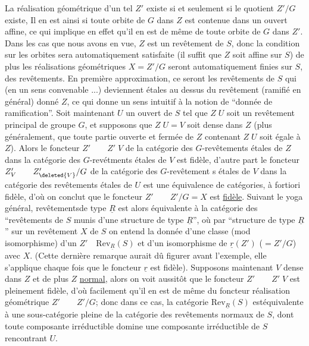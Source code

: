 La réalisation géométrique d'un tel $Z'$ existe si et seulement si le quotient $Z'/G$ existe,  Il en est ainsi si toute orbite de $G$ dans $Z$ est contenue dans un ouvert affine, ce qui implique en effet qu'il en est de même de toute orbite de $G$ dans $Z'$.  Dans les cas que nous avons en vue, $Z$ est un revêtement de $S$, donc la condition sur les orbites sera automatiquement satisfaite (il suffit que $Z$ soit affine sur $S$) de plus les réalisations géométriques $X=Z'/G$ seront automatiquement finies sur $S$,  des revêtements. En première approximation, ce seront les revêtements de $S$ qui (en  un sens convenable ...) deviennent étales au dessus du revêtement (ramifié en général) donné $Z$, ce qui donne un sens intuitif à la notion de ``donnée de ramification''. Soit maintenant $U$ un ouvert de $S$ tel que $Z\;U$ soit un revêtement principal de groupe $G$, et supposons que $Z\;U=V$ soit dense dans $Z$ (plus généralement, que toute partie ouverte et fermée de $Z$ contenant $Z\;U$  soit égale à $Z$). Alors le foncteur $Z'\qquad Z'\;V$ de la catégorie des $G$-revêtements étales de $Z$ dans la catégorie des $G$-revétments étales de $V$ est fidèle, d'autre part le foncteur $Z'_V\qquad Z'_{\deleted{V}}/G$ de la catégorie des $G$-revêtement s étales de $V$ dans la catégorie des revêtements étales de $U$ est une équivalence de catégories, à fortiori fidèle, d'où on conclut que le foncteur  $Z'\qquad Z'/G=X$ est \uline{fidèle}. Suivant le yoga général,  revêtementsde type $\underline{R}$  est alors équivalente à la catégorie des ``revêtements de $S$ munis d'une structure de type $\underline{R}$'', où par ``structure de type $\underline{R}$'' sur un revêtement $X$ de $S$ on entend la donnée d'une classe (mod isomorphisme) d'un $Z'\quad\mathrm{Rev}_{\underline{R}}(S)$ et d'un isomorphisme de $\underline{r}(Z')$ ($=Z'/G$) avec $X$. (Cette
dernière remarque aurait dû figurer avant l'exemple, elle s'applique chaque fois que le foncteur $\underline{r}$ est fidèle).  Supposons maintenant $V$ dense dans $Z$ et de plus $Z$ \uline{normal}, alors on voit aussitôt que le foncteur $Z'\qquad Z'\;V$ est pleinement fidèle, d'où  facilement qu'il en est de même du foncteur réalisation géométrique $Z'\qquad Z'/G$; donc dans ce cas, la catégorie $\mathrm{Rev}_{\underline{R}}(S)$  estéquivalente à une sous-catégorie pleine de la catégorie des revêtements  normaux de $S$, dont toute composante  irréductible domine une composante irréductible de $S$ rencontrant $U$.

